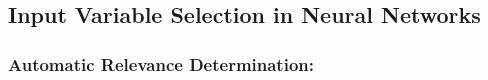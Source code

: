 


\subsection{Input Variable Selection in Neural Networks}
\label{subsec:ch3-input}

\subsubsection*{Automatic Relevance Determination:}
\label{subsec:ch3-ard}


